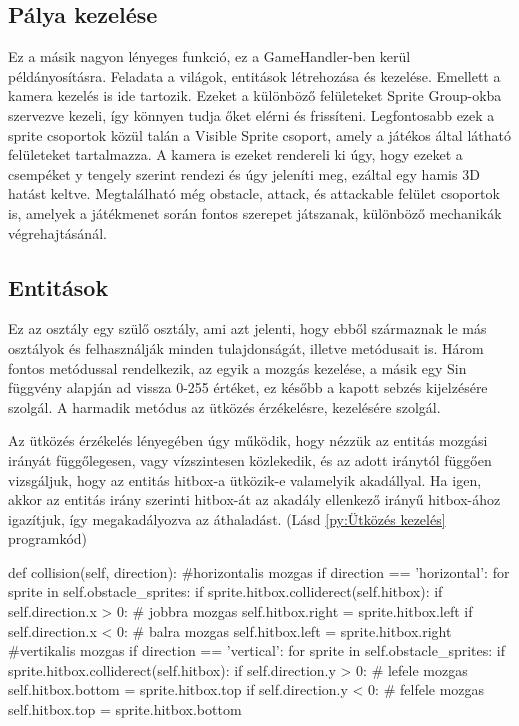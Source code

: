 \subsection{Pálya kezelése}
\indent \indent Ez a másik nagyon lényeges funkció, ez a GameHandler-ben kerül példányosításra. Feladata a világok, entitások létrehozása és kezelése. Emellett a kamera kezelés is ide tartozik. 
Ezeket a különböző felületeket Sprite Group-okba szervezve kezeli, így könnyen tudja őket elérni és frissíteni.
Legfontosabb ezek a sprite csoportok közül talán a Visible Sprite csoport, amely a játékos által látható felületeket tartalmazza. A kamera is ezeket rendereli ki úgy, hogy ezeket a csempéket y tengely szerint rendezi és úgy jeleníti meg, ezáltal egy hamis 3D hatást keltve.
Megtalálható még obstacle, attack, és attackable felület csoportok is, amelyek a játékmenet során fontos szerepet játszanak, különböző mechanikák végrehajtásánál.


\subsection{Entitások}
\indent \indent Ez az osztály egy szülő osztály, ami azt jelenti, hogy ebből származnak le más osztályok és felhasználják minden tulajdonságát, illetve metódusait is.  
Három fontos metódussal rendelkezik, az egyik a mozgás kezelése, a másik egy Sin függvény alapján ad vissza 0-255 értéket, ez később a kapott sebzés kijelzésére szolgál. A harmadik metódus az ütközés érzékelésre, kezelésére szolgál.

Az ütközés érzékelés lényegében úgy működik, hogy nézzük az entitás mozgási irányát függőlegesen, vagy vízszintesen közlekedik, és az adott iránytól függően vizsgáljuk, hogy az entitás hitbox-a ütközik-e valamelyik akadállyal. Ha igen, akkor az entitás irány szerinti hitbox-át az akadály ellenkező irányű hitbox-ához igazítjuk, így megakadályozva az áthaladást. (Lásd \ref{py:Ütközés kezelés} programkód)
\begin{python}[caption={Ütközés kezelés},label=py:Ütközés kezelés]
def collision(self, direction):
    #horizontalis mozgas
    if direction == 'horizontal':
        for sprite in self.obstacle_sprites:
            if sprite.hitbox.colliderect(self.hitbox):
                if self.direction.x > 0:
                # jobbra mozgas
                    self.hitbox.right = sprite.hitbox.left
                if self.direction.x < 0:
                # balra mozgas
                    self.hitbox.left = sprite.hitbox.right                   
    #vertikalis mozgas
    if direction == 'vertical':
        for sprite in self.obstacle_sprites:
            if sprite.hitbox.colliderect(self.hitbox):
                    if self.direction.y > 0:
                        # lefele mozgas
                        self.hitbox.bottom = sprite.hitbox.top
                        if self.direction.y < 0:
                        # felfele mozgas
                        self.hitbox.top = sprite.hitbox.bottom
                    \end{python} 

